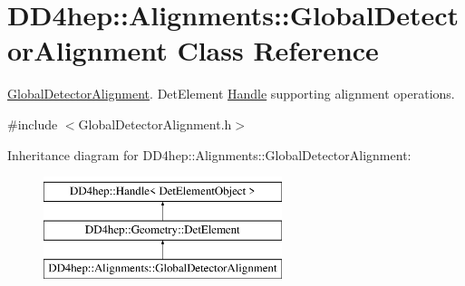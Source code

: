 \hypertarget{class_d_d4hep_1_1_alignments_1_1_global_detector_alignment}{}\section{D\+D4hep\+:\+:Alignments\+:\+:Global\+Detector\+Alignment Class Reference}
\label{class_d_d4hep_1_1_alignments_1_1_global_detector_alignment}


\hyperlink{class_d_d4hep_1_1_alignments_1_1_global_detector_alignment}{Global\+Detector\+Alignment}. Det\+Element \hyperlink{class_d_d4hep_1_1_handle}{Handle} supporting alignment operations.  




{\ttfamily \#include $<$Global\+Detector\+Alignment.\+h$>$}

Inheritance diagram for D\+D4hep\+:\+:Alignments\+:\+:Global\+Detector\+Alignment\+:\begin{figure}[H]
\begin{center}
\leavevmode
\includegraphics[height=3.000000cm]{class_d_d4hep_1_1_alignments_1_1_global_detector_alignment}
\end{center}
\end{figure}
